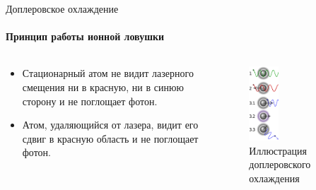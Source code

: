 \documentclass{beamer}
\begin{document}
	
	



    \begin{frame}{Доплеровское охлаждение}
    \framesubtitle{Принцип работы ионной ловушки}

        \begin{columns}

        \begin{column}{0.5\textwidth}

            \begin{itemize}
                \item Стационарный атом не видит лазерного смещения ни в красную, ни в синюю сторону и не поглощает фотон.
                \item Атом, удаляющийся от лазера, видит его сдвиг в красную область и не поглощает фотон.
            
            \end{itemize}

        \end{column}

        \begin{column}{0.5\textwidth}
            \begin{figure}
                \centering
                \includegraphics[width=0.35\textwidth]{media/dopler-cooling.png}
                \caption{Иллюстрация доплеровского охлаждения}
            \end{figure}
        \end{column}

        \end{columns}
    \end{frame}
\end{document}
